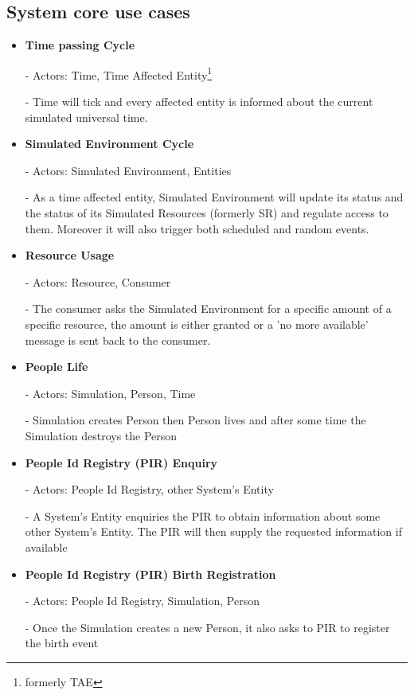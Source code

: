 \subsection{System core use cases}
\begin{itemize}
  \item \textbf{Time passing Cycle}  
	
	- Actors: Time, Time Affected Entity\footnote{formerly TAE}

	- Time will tick and every affected entity is informed about the current
simulated universal time.

  \item \textbf{Simulated Environment Cycle}

	- Actors: Simulated Environment, Entities

	- As a time affected entity, Simulated Environment will update its
status and the status of its Simulated Resources (formerly SR) and regulate
access to them. Moreover it will also trigger both scheduled and random events.

  \item \textbf{Resource Usage}

	- Actors: Resource, Consumer

	- The consumer asks the Simulated Environment for a specific amount of a
specific resource, the amount is either granted or a 'no more available' message
is sent back to the consumer.

  \item \textbf{People Life} 

	- Actors: Simulation, Person, Time

	- Simulation creates Person then Person lives and after some time the
Simulation destroys the Person

  \item \textbf{People Id Registry (PIR) Enquiry}

	- Actors: People Id Registry, other System's Entity

	- A System's Entity enquiries the PIR to obtain information about some
other System's Entity. The PIR will then supply the requested information  if
available

  \item \textbf{People Id Registry (PIR) Birth Registration}

	- Actors: People Id Registry, Simulation, Person

	- Once the Simulation creates a new Person, it also asks to PIR to
register the birth event


\end{itemize}
